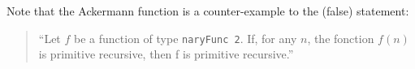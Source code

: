 






      


\begin{remark}
Note that the Ackermann function is a counter-example to the (false) statement:
\begin{quote}
{\color{red}
  ``Let $f$ be a function of type \texttt{naryFunc\,2}. If, for any $n$, the fonction $f(n)$ is primitive recursive, then f is primitive recursive.''}
\end{quote}
\end{remark}




